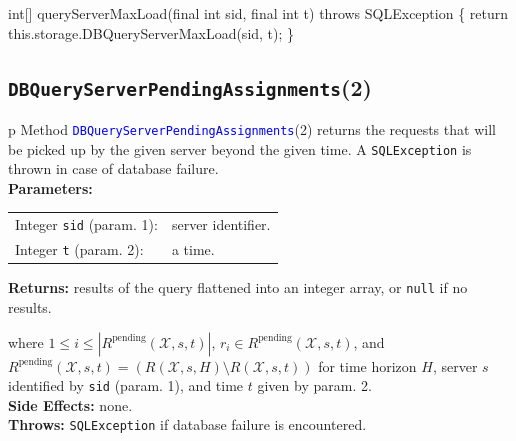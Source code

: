 \nwenddocs{}\endmoddef{}
int[] queryServerMaxLoad(final int sid, final int t) throws SQLException \{
  return this.storage.DBQueryServerMaxLoad(sid, t);
\}
\eatline
{}\nwendcode{}\nwdocspar
\subsection{\texttt{DBQueryServerPendingAssignments}(2)}
\begin{tabular}{p{\textwidth}}
\toprule
{}
Method \textcolor{blue}{{\tt{}\protect{}DBQueryServerPendingAssignments}}(2) returns the
requests that will be picked up by the given server beyond the given time.
A {\tt{}SQLException} is thrown in case of database failure.\\
\midrule
\textbf{Parameters:} \\
\begin{tabular}{lp{116mm}}
Integer {\tt{}sid} (param. 1):&server identifier.\\
Integer {\tt{}t} (param. 2):&a time.\\
\end{tabular}
\textbf{Returns:} results of the query flattened into an integer array,
or {\tt{}null} if no results.


where $1\leq i\leq |R^\textrm{pending}(\mathcal{X}, s, t)|$,
$r_i\in R^\textrm{pending}(\mathcal{X}, s, t)$, and
$R^\textrm{pending}(\mathcal{X}, s, t)= (R(\mathcal{X},s,H)\setminus R(\mathcal{X},s,t))$ for
time horizon $H$, server $s$ identified by {\tt{}sid} (param. 1), and time $t$ given by param. 2.\\
\textbf{Side Effects:} none.\\
\textbf{Throws:} {\tt{}SQLException} if database failure is encountered.\\
\bottomrule
\end{tabular}
